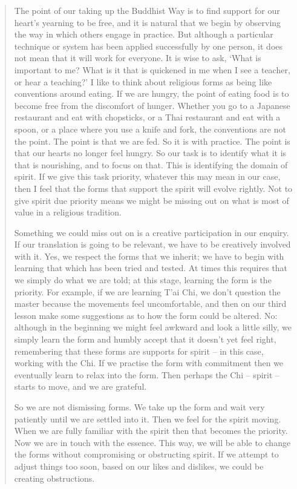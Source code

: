 \begin{quote}
The point of our taking up the Buddhist Way is to find support for our
heart's yearning to be free, and it is natural that we begin by
observing the way in which others engage in practice. But although a
particular technique or system has been applied successfully by one
person, it does not mean that it will work for everyone. It is wise to
ask, `What is important to me? What is it that is quickened in me when I
see a teacher, or hear a teaching?' I like to think about religious
forms as being like conventions around eating. If we are hungry, the
point of eating food is to become free from the discomfort of hunger.
Whether you go to a Japanese restaurant and eat with chopsticks, or a
Thai restaurant and eat with a spoon, or a place where you use a knife
and fork, the conventions are not the point. The point is that we are
fed. So it is with practice. The point is that our hearts no longer feel
hungry. So our task is to identify what it is that is nourishing, and to
focus on that. This is identifying the domain of spirit. If we give this
task priority, whatever this may mean in our case, then I feel that the
forms that support the spirit will evolve rightly. Not to give spirit
due priority means we might be missing out on what is most of value in a
religious tradition.

Something we could miss out on is a creative participation in our
enquiry. If our translation is going to be relevant, we have to be
creatively involved with it. Yes, we respect the forms that we inherit;
we have to begin with learning that which has been tried and tested. At
times this requires that we simply do what we are told; at this stage,
learning the form is the priority. For example, if we are learning T'ai
Chi, we don't question the master because the movements feel
uncomfortable, and then on our third lesson make some suggestions as to
how the form could be altered. No: although in the beginning we might
feel awkward and look a little silly, we simply learn the form and
humbly accept that it doesn't yet feel right, remembering that these
forms are supports for spirit -- in this case, working with the Chi. If
we practise the form with commitment then we eventually learn to relax
into the form. Then perhaps the Chi -- spirit -- starts to move, and we
are grateful.

So we are not dismissing forms. We take up the form and wait very
patiently until we are settled into it. Then we feel for the spirit
moving. When we are fully familiar with the spirit then that becomes the
priority. Now we are in touch with the essence. This way, we will be
able to change the forms without compromising or obstructing spirit. If
we attempt to adjust things too soon, based on our likes and dislikes,
we could be creating obstructions.


\end{quote}
